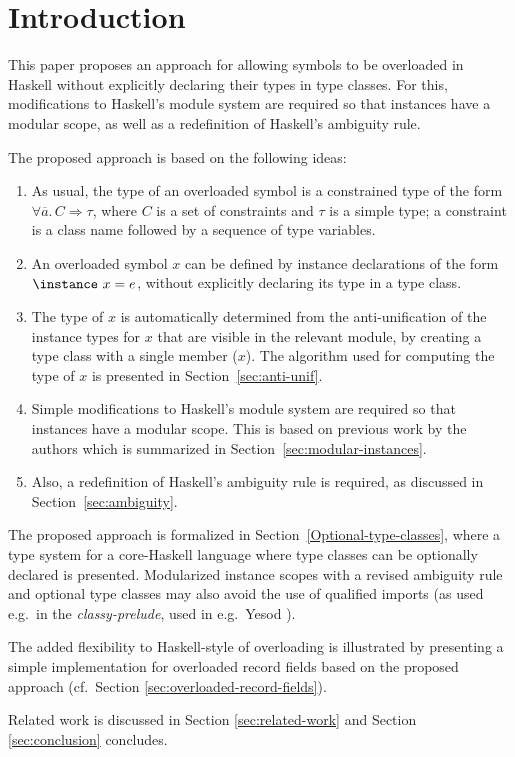 \section{Introduction}
\label{sec:intro}

This paper proposes an approach for allowing symbols to be overloaded
in Haskell without explicitly declaring their types in type
classes. For this, modifications to Haskell's module system are
required so that instances have a modular scope, as well as a
redefinition of Haskell's ambiguity rule.

The proposed approach is based on the following ideas:

\begin{enumerate}

 \item As usual, the type of an overloaded symbol is a constrained
   type of the form $\forall \overline{a}.\,C \Rightarrow \tau$, where
   $C$ is a set of constraints and $\tau$ is a simple type; a
   constraint is a class name followed by a sequence of type
   variables.

\item An overloaded symbol $x$ can be defined by instance declarations
  of the form $\instance\ x=e$, without explicitly declaring its type
  in a type class.

\item The type of $x$ is automatically determined from the
  anti-unification of the instance types for $x$ that are visible in
  the relevant module, by creating a type class with a single member
  ($x$). The algorithm used for computing the type of $x$ is presented
  in Section~\ref{sec:anti-unif}.

\item Simple modifications to Haskell's module system are required so
  that instances have a modular scope. This is based on previous work
  by the authors which is summarized in
  Section~\ref{sec:modular-instances}.

\item Also, a redefinition of Haskell's ambiguity rule is required, as
  discussed in Section~\ref{sec:ambiguity}.

\end{enumerate}

The proposed approach is formalized in
Section~\ref{Optional-type-classes}, where a type system for a
core-Haskell language where type classes can be optionally declared is
presented. Modularized instance scopes with a revised ambiguity rule
and optional type classes may also avoid the use of qualified imports
(as used e.g.~in the {\em classy-prelude}, used in e.g.~Yesod
\cite{Yesod}).

The added flexibility to Haskell-style of overloading is illustrated
by presenting a simple implementation for overloaded record fields
based on the proposed approach (cf.~Section
\ref{sec:overloaded-record-fields}).

Related work is discussed in Section \ref{sec:related-work} and
Section \ref{sec:conclusion} concludes.


